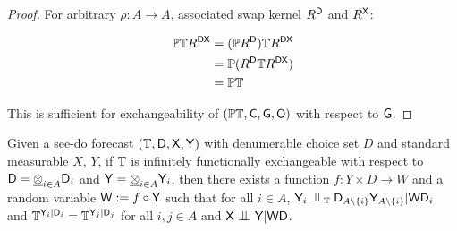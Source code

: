 \begin{proof}

For arbitrary $\rho:A\to A$, associated swap kernel $R^{\mathsf{D}}$ and $R^{\mathsf{X}}$:

\begin{align}
    \mathbb{P}\mathbb{T} R^{\mathsf{D}\mathsf{X}} &= (\mathbb{P} R^{\mathsf{D}}) \mathbb{T} R^{\mathsf{D}\mathsf{X}}\\
                                  &= \mathbb{P}(R^{\mathsf{D}}\mathbb{T}R^{\mathsf{D}\mathsf{X}})\\
                                  &= \mathbb{P}\mathbb{T}
\end{align}

This is sufficient for exchangeability of $(\mathbb{P}\mathbb{T},\mathsf{C},\mathsf{G},\mathsf{O})$ with respect to $\mathsf{G}$.
\end{proof}


\begin{lemma}\label{lem:rep_fex_sdf}
Given a see-do forecast $(\mathbb{T},\mathsf{D},\mathsf{X},\mathsf{Y})$ with denumerable choice set $D$ and standard measurable $X$, $Y$, if $\mathbb{T}$ is infinitely functionally exchangeable with respect to $\mathsf{D}=\underline{\otimes}_{i\in A}\mathsf{D}_i$ and $\mathsf{Y}=\underline{\otimes}_{i\in A} \mathsf{Y}_i$, then there exists a function $f:Y\times D\to W$ and a random variable $\mathsf{W}:=f\circ \mathsf{Y}$ such that for all $i\in A$, $\RV{Y}_i\CI_{\kernel{T}}\RV{D}_{A\setminus\{i\}}\RV{Y}_{A\setminus \{i\}}|\RV{W}\RV{D}_i$ and $\mathbb{T}^{\mathsf{Y}_i|\mathsf{D}_i}=\mathbb{T}^{\mathsf{Y}_j|\mathsf{D}_j}$ for all $i,j\in A$ and $\RV{X}\CI\RV{Y}|\RV{W}\RV{D}$.

\end{lemma}

